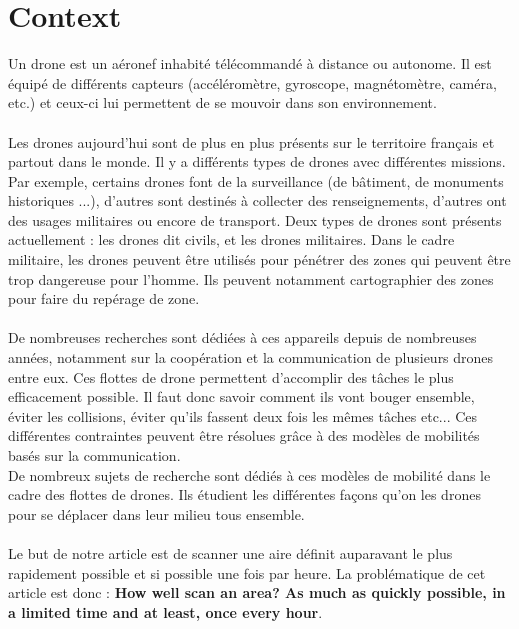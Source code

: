 \section{Context}


Un drone est un aéronef inhabité télécommandé à distance ou autonome. Il est équipé de différents capteurs (accéléromètre, gyroscope, magnétomètre, caméra, etc.) et ceux-ci lui permettent de se mouvoir dans son environnement. \\\\

Les drones aujourd'hui sont de plus en plus présents sur le territoire français et partout dans le monde. Il y a différents types de drones avec différentes missions. Par exemple, certains drones font de la surveillance (de bâtiment, de monuments historiques ...), d'autres sont destinés à collecter des renseignements, d'autres ont des usages militaires ou encore de transport. Deux types de drones sont présents actuellement : les drones dit civils, et les drones militaires. Dans le cadre militaire, les drones peuvent être utilisés pour pénétrer des zones qui peuvent être trop dangereuse pour l'homme. Ils peuvent notamment cartographier des zones pour faire du repérage de zone.\\\\


  De nombreuses recherches sont dédiées à ces appareils depuis de nombreuses années, notamment sur la coopération et la communication de plusieurs drones entre eux. Ces flottes de drone permettent d'accomplir des tâches le plus efficacement possible. Il faut donc savoir comment ils vont bouger ensemble, éviter les collisions, éviter qu'ils fassent deux fois les mêmes tâches etc... Ces différentes contraintes peuvent être résolues grâce à des modèles de mobilités basés sur la communication.\\
  De nombreux sujets de recherche sont dédiés à ces modèles de mobilité dans le cadre des flottes de drones. Ils étudient les différentes façons qu'on les drones pour se déplacer dans leur milieu tous ensemble.\\\\
  
Le but de notre article est de scanner une aire définit auparavant le plus rapidement possible et si possible une fois par heure. La problématique de cet article est donc :
\textbf{How well scan an area? As much as quickly possible, in a limited time and at least, once every hour}.\\\\

